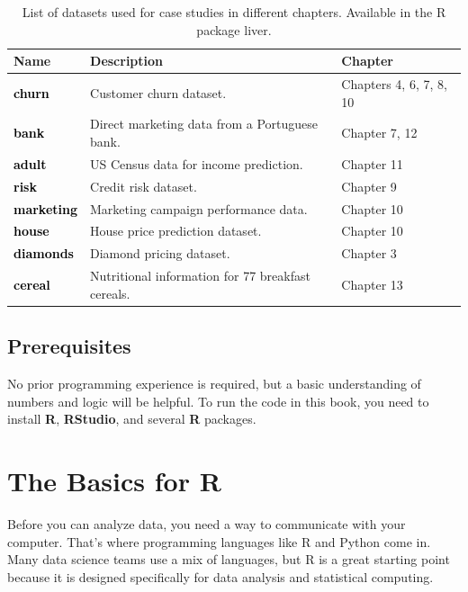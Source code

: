 \documentclass[
]{book}
\theoremstyle{definition}
\theoremstyle{definition}
\theoremstyle{definition}
\theoremstyle{definition}
\theoremstyle{remark}
\begin{document}
\begin{table}
\centering
\caption{\label{tab:data-table}List of datasets used for case studies in different chapters. Available in the R package liver.}
\centering
\begin{tabular}[t]{>{}l>{\raggedright\arraybackslash}p{20em}l}
\toprule
Name & Description & Chapter\\
\midrule
\textcolor{black}{\textbf{churn}} & Customer churn dataset. & Chapters 4, 6, 7, 8, 10\\
\textcolor{black}{\textbf{bank}} & Direct marketing data from a Portuguese bank. & Chapter 7, 12\\
\textcolor{black}{\textbf{adult}} & US Census data for income prediction. & Chapter 11\\
\textcolor{black}{\textbf{risk}} & Credit risk dataset. & Chapter 9\\
\textcolor{black}{\textbf{marketing}} & Marketing campaign performance data. & Chapter 10\\
\addlinespace
\textcolor{black}{\textbf{house}} & House price prediction dataset. & Chapter 10\\
\textcolor{black}{\textbf{diamonds}} & Diamond pricing dataset. & Chapter 3\\
\textcolor{black}{\textbf{cereal}} & Nutritional information for 77 breakfast cereals. & Chapter 13\\
\bottomrule
\end{tabular}
\end{table}

\section*{Prerequisites}\label{prerequisites}

No prior programming experience is required, but a basic understanding of numbers and logic will be helpful. To run the code in this book, you need to install \textbf{R}, \textbf{RStudio}, and several \textbf{R} packages.

\chapter{The Basics for R}\label{chapter-into-R}

Before you can analyze data, you need a way to communicate with your computer. That's where programming languages like R and Python come in. Many data science teams use a mix of languages, but R is a great starting point because it is designed specifically for data analysis and statistical computing.
\end{document}
